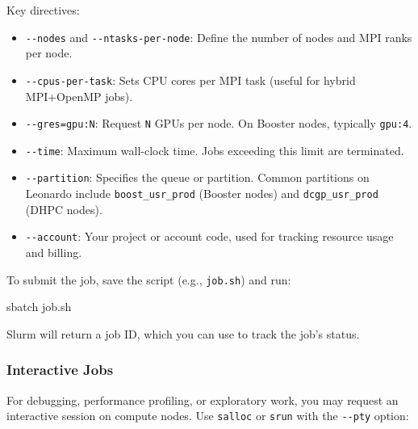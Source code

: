 Key directives:

\begin{itemize}
    \item \texttt{-{}-nodes} and \texttt{-{}-ntasks-per-node}: Define the number of nodes and MPI ranks per node.
    \item \texttt{-{}-cpus-per-task}: Sets CPU cores per MPI task (useful for hybrid MPI+OpenMP jobs).
    \item \texttt{-{}-gres=gpu:N}: Request \texttt{N} GPUs per node. On Booster nodes, typically \texttt{gpu:4}.
    \item \texttt{-{}-time}: Maximum wall-clock time. Jobs exceeding this limit are terminated.
    \item \texttt{-{}-partition}: Specifies the queue or partition. Common partitions on Leonardo include \texttt{boost\_usr\_prod} (Booster nodes) and \texttt{dcgp\_usr\_prod} (DHPC nodes).
    \item \texttt{-{}-account}: Your project or account code, used for tracking resource usage and billing.
\end{itemize}

To submit the job, save the script (e.g., \texttt{job.sh}) and run:

\vspace{-0.2em}

\begin{codeblock}[language=bash, numbers=none]
sbatch job.sh
\end{codeblock}

\vspace{-0.2em}

Slurm will return a job ID, which you can use to track the job's status.

\subsubsection{Interactive Jobs}

For debugging, performance profiling, or exploratory work, you may request an interactive session on compute nodes. Use \texttt{salloc} or \texttt{srun} with the \texttt{-{}-pty} option:

